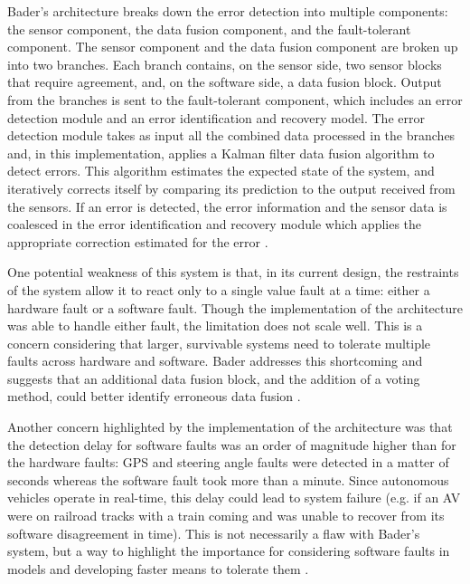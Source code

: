 \documentclass[twoside, conference]{IEEEtran}
\begin{document}
Bader's architecture breaks down the error detection into multiple components: the sensor component, the data fusion component, and the fault-tolerant component. The sensor component and the data fusion component are broken up into two branches. Each branch contains, on the sensor side, two sensor blocks that require agreement, and, on the software side, a data fusion block. Output from the branches is sent to the fault-tolerant component, which includes an error detection module and an error identification and recovery model. The error detection module takes as input all the combined data processed in the branches and, in this implementation, applies a Kalman filter data fusion algorithm to detect errors. This algorithm estimates the expected state of the system, and iteratively corrects itself by comparing its prediction to the output received from the sensors. If an error is detected, the error information and the sensor data is coalesced in the error identification and recovery module which applies the appropriate correction estimated for the error \cite{Bader2014}.

One potential weakness of this system is that, in its current design, the restraints of the system allow it to react only to a single value fault at a time: either a hardware fault or a software fault. Though the implementation of the architecture was able to handle either fault, the limitation does not scale well. This is a concern considering that larger, survivable systems need to tolerate multiple faults across hardware and software. Bader addresses this shortcoming and suggests that an additional data fusion block, and the addition of a voting method, could better identify erroneous data fusion \cite{Bader2014}.

Another concern highlighted by the implementation of the architecture was that the detection delay for software faults was an order of magnitude higher than for the hardware faults: GPS and steering angle faults were detected in a matter of seconds whereas the software fault took more than a minute. Since autonomous vehicles operate in real-time, this delay could lead to system failure (e.g. if an AV were on railroad tracks with a train coming and was unable to recover from its software disagreement in time). This is not necessarily a flaw with Bader's system, but a way to highlight the importance for considering software faults in models and developing faster means to tolerate them \cite{Bader2014}.	
	
\end{document}
